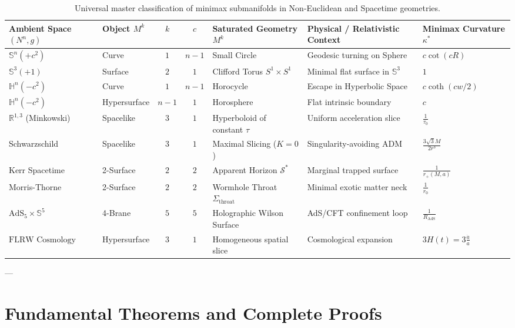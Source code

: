 \documentclass[11pt,reqno]{amsart}
\theoremstyle{definition}
\providecommand{\R}{\mathbb{R}}
\providecommand{\Hyp}{\mathbb{H}}
\providecommand{\Sph}{\mathbb{S}}
\numberwithin{equation}{section}
\providecommand{\Hyp}{\mathbb{H}}
\providecommand{\Sph}{\mathbb{S}}
\providecommand{\R}{\mathbb{R}}
\begin{document}
\begin{table}[htbp]
\centering
\scriptsize
\renewcommand{\arraystretch}{1.3}
\begin{tabularx}{\textwidth}{@{}l l c c >{\raggedright\arraybackslash}X >{\raggedright\arraybackslash}X >{\raggedright\arraybackslash}p{2.3cm}@{}}
\toprule
Ambient Space $(N^n, g)$ & Object $M^k$ & $k$ & $c$ & Saturated Geometry $M^k$ & Physical / Relativistic Context & Minimax Curvature $\kappa^*$ \\
\midrule
$\Sph^n(+c^2)$ & Curve & $1$ & $n-1$ & Small Circle & Geodesic turning on Sphere & $c \cot(c R)$ \\
$\Sph^3(+1)$ & Surface & $2$ & $1$ & Clifford Torus $S^1 \times S^1$ & Minimal flat surface in $\Sph^3$ & $1$ \\
$\Hyp^n(-c^2)$ & Curve & $1$ & $n-1$ & Horocycle & Escape in Hyperbolic Space & $c \coth(cw/2)$ \\
$\Hyp^n(-c^2)$ & Hypersurface & $n-1$ & $1$ & Horosphere & Flat intrinsic boundary & $c$ \\
$\R^{1,3}$ (Minkowski) & Spacelike & $3$ & $1$ & Hyperboloid of constant $\tau$ & Uniform acceleration slice & $\frac{1}{\tau_0}$ \\
Schwarzschild & Spacelike & $3$ & $1$ & Maximal Slicing ($K = 0$) & Singularity-avoiding ADM & $\frac{3\sqrt{3} M}{2 r^3}$ \\
Kerr Spacetime & 2-Surface & $2$ & $2$ & Apparent Horizon $\mathcal{S}^*$ & Marginal trapped surface & $\frac{1}{r_+(M, a)}$ \\
Morris-Thorne & 2-Surface & $2$ & $2$ & Wormhole Throat $\Sigma_{\text{throat}}$ & Minimal exotic matter neck & $\frac{1}{r_0}$ \\
$\text{AdS}_5 \times \Sph^5$ & 4-Brane & $5$ & $5$ & Holographic Wilson Surface \cite{bachas1996, polchinski1998} & AdS/CFT confinement loop & $\frac{1}{R_{\text{AdS}}}$ \\
$\text{FLRW Cosmology}$ & Hypersurface & $3$ & $1$ & Homogeneous spatial slice & Cosmological expansion & $3 H(t) = 3\frac{\dot{a}}{a}$ \\
\bottomrule
\end{tabularx}
\caption{Universal master classification of minimax submanifolds in Non-Euclidean and Spacetime geometries.}
\label{tab:noneuclidean_master}
\end{table}

---

\section{Fundamental Theorems and Complete Proofs}
\end{document}
